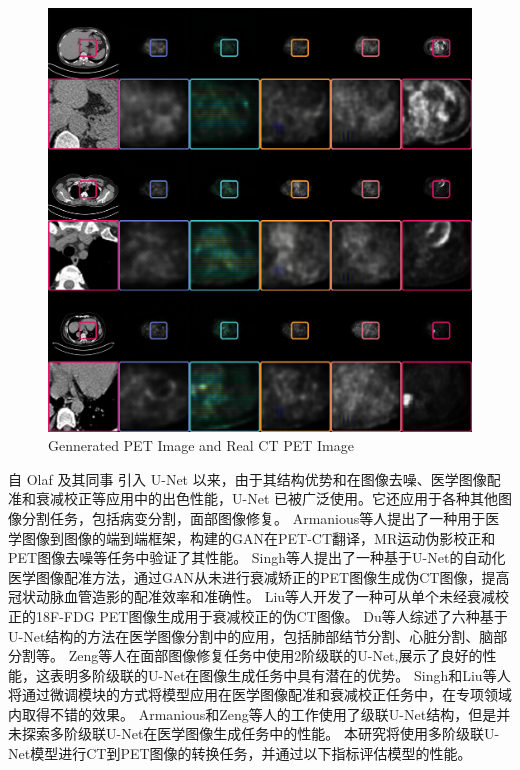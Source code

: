 \documentclass[twocolumn]{article}
\begin{document}
\begin{figure}[t!]
	\centering
	\includegraphics[width=1.0\linewidth]{u-net/lung/lung_compare.png}
	\caption[lung_compare]{Gennerated PET Image and Real CT PET Image}
	\label{fig:lung_compare}
\end{figure}

自 Olaf 及其同事 \cite{navab_u-net_2015} 引入 U-Net 以来，由于其结构优势和在图像去噪、医学图像配准和衰减校正等应用中的出色性能，U-Net 已被广泛使用。它还应用于各种其他图像分割任务，包括病变分割，面部图像修复。
Armanious等人\cite{armanious_medgan_2020}提出了一种用于医学图像到图像的端到端框架，构建的GAN在PET-CT翻译，MR运动伪影校正和PET图像去噪等任务中验证了其性能。
Singh等人\cite{singh_automated_2023}提出了一种基于U-Net的自动化医学图像配准方法，通过GAN从未进行衰减矫正的PET图像生成伪CT图像，提高冠状动脉血管造影的配准效率和准确性。
Liu等人\cite{liu_deep_2018}开发了一种可从单个未经衰减校正的18F-FDG PET图像生成用于衰减校正的伪CT图像。
Du等人\cite{du_medical_2020}综述了六种基于U-Net结构的方法在医学图像分割中的应用，包括肺部结节分割、心脏分割、脑部分割等。
Zeng等人\cite{zeng_swin-casunet_2022}在面部图像修复任务中使用2阶级联的U-Net,展示了良好的性能，这表明多阶级联的U-Net在图像生成任务中具有潜在的优势。
Singh和Liu等人将通过微调模块的方式将模型应用在医学图像配准和衰减校正任务中，在专项领域内取得不错的效果。
Armanious和Zeng等人的工作使用了级联U-Net结构，但是并未探索多阶级联U-Net在医学图像生成任务中的性能。
本研究将使用多阶级联U-Net模型进行CT到PET图像的转换任务，并通过以下指标评估模型的性能。
\end{document}
